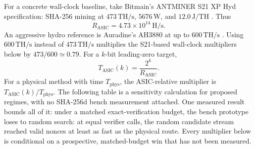 \documentclass[11pt]{article}
\theoremstyle{definition}
\theoremstyle{remark}
\begin{document}
For a concrete wall-clock baseline, take Bitmain's ANTMINER S21 XP Hyd
specification: SHA-256 mining at \(473\,\mathrm{TH/s}\), \(5676\,\mathrm{W}\),
and \(12.0\,\mathrm{J/TH}\) \cite{BitmainS21XPHyd2024}. Thus
\[
R_{\mathrm{ASIC}}=4.73\times10^{14}\ \mathrm{H/s}.
\]
An aggressive hydro reference is Auradine's AH3880 at up to
\(600\,\mathrm{TH/s}\) \cite{AuradineAH38802025}. Using \(600\,\mathrm{TH/s}\)
instead of \(473\,\mathrm{TH/s}\) multiplies the S21-based wall-clock
multipliers below by \(473/600\simeq0.79\). For a \(k\)-bit leading-zero target,
\[
T_{\mathrm{ASIC}}(k)=\frac{2^k}{R_{\mathrm{ASIC}}}.
\]
For a physical method with time \(T_{\mathrm{phys}}\), the ASIC-relative
multiplier is \(T_{\mathrm{ASIC}}(k)/T_{\mathrm{phys}}\). The following table is
a sensitivity calculation for proposed regimes, with no SHA-256d bench
measurement attached. One measured result bounds all of it: under a matched
exact-verification budget, the bench prototype loses to random search: at
equal verifier calls, the random candidate stream reached valid nonces at
least as fast as the physical route. Every multiplier below is conditional on
a prospective, matched-budget win that has not been measured.
\end{document}
